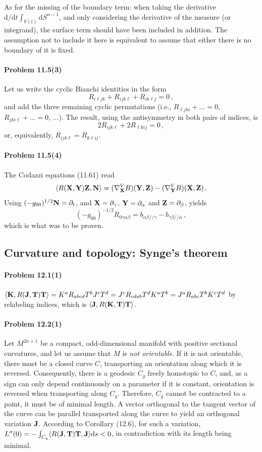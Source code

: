\documentclass[a4paper,12pt]{article}
\def\d{\mathrm{d}}
\newcommand{\problem}[1]{\paragraph{Problem #1}}
\begin{document}
As for the missing of the boundary term: when taking the derivative $\d/\d t \int_{V(t)}\d S^{n-1}$, and only considering the derivative of the measure (or integrand), the surface term should have been included in addition. The assumption not to include it here is equivalent to assume that either there is no boundary of it is fixed.


\problem{11.5(3)} Let us write the cyclic Bianchi identities in the form
\[
 R_{i\ell jk} + R_{ijk\ell} + R_{ik\ell j} =0\,,
\]
and add the three remaining cyclic permutations (i.e., $R_{\ell jki} + \dots =0$, $R_{jki\ell} + \dots =0$, $\dots$). The result, using the antisymmetry in both pairs of indices, is
\[
 2R_{ijk\ell} + 2 R_{\ell k i j} = 0\,,
\]
or, equivalently, $R_{ijk\ell} = R_{k\ell ij}$.


\problem{11.5(4)} The Codazzi equations (11.61) read
\[
 \langle R({\bf X}, {\bf Y}){\bf Z}, {\bf N}\rangle = (\nabla_{\bf X}^V B)({\bf Y}, {\bf Z}) - (\nabla_{\bf Y}^V B)({\bf X}, {\bf Z})\,.
\]
Using $(-g_{00})^{1/2}{\bf N} = \partial_t$, and ${\bf X}=\partial_\gamma$, ${\bf Y} = \partial_\alpha$ and ${\bf Z} = \partial_\beta$, yields
\[
 (-g_{00})^{-1/2}R_{0\gamma\alpha\beta} = b_{\alpha\beta//\gamma} - b_{\gamma\beta//\alpha}\,,
\]
which is what was to be proven.


\subsection{Curvature and topology: Synge's theorem}


\problem{12.1(1)} $\langle {\bf K}, R({\bf J}, {\bf T}){\bf T}\rangle = K^a R_{abcd}T^b J^cT^d = J^c R_{cdab}T^d K^a T^b = J^a R_{abc}T^bK^c T^d$ by relabeling indices, which is $\langle {\bf J}, R({\bf K}, {\bf T}){\bf T}\rangle$.


\problem{12.2(1)} Let $M^{2n+1}$ be a compact, odd-dimensional manifold with positive sectional curvatures, and let us assume that $M$ is {\sl not orientable}. If it is not orientable, there must be a closed curve $C$, transporting an orientation along which it is reversed. Consequently, there is a geodesic $C_g$ freely homotopic to $C$, and, as a sign can only depend continuously on a parameter if it is constant, orientation is reversed when transporting along $C_g$. Therefore, $C_g$ cannot be contracted to a point, it must be of minimal length. A vector orthogonal to the tangent vector of the curve can be parallel transported along the curve to yield an orthogonal variation ${\bf J}$. According to Corollary (12.6), for such a variation, $L''(0) = -\int_{C_g} \langle R({{\bf J}, {\bf T}}){\bf T}, {\bf J}\rangle \d s <0$, in contradiction with its length being minimal.
\end{document}
